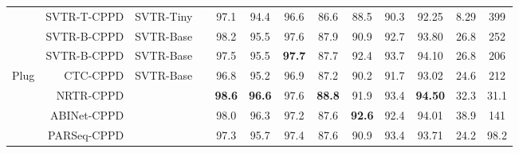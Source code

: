 \documentclass[10pt,journal,compsoc]{IEEEtran}
\begin{document}
\begin{table*}[t]
{\begin{tabular}{c|r|c|c|ccc|ccc|c|cc}
                        & SVTR-T-CPPD & SVTR-Tiny  &     & 97.1          & 94.4          & 96.6          & 86.6 & 88.5          & 90.3          & 92.25                                           & 8.29                                                                      & 399                                                               \\
& SVTR-B-CPPD  & SVTR-Base &     & 98.2 & 95.5 & 97.6 & 87.9 & 90.9 & 92.7 & 93.80                                                                       & 26.8                                                                      & 252                                                               \\
\cline{4-4}                        & SVTR-B-CPPD  & SVTR-Base &     & 97.5 & 95.5 & \textbf{97.7} & 87.7 & 92.4 & 93.7 & 94.10                                                                      & 26.8                                                                      & 206                                                               \\
\hline
\multirow{4}{*}{Plug}    & CTC-CPPD & \multirow{4}{*}{SVTR-Base} & \multirow{4}{*}{}     & 96.8 & 95.2 & 96.9 & 87.2 & 90.2 & 91.7 & 93.02 & 24.6 &212\\
&NRTR-CPPD &     &                        & \textbf{98.6} & \textbf{96.6} & 97.6 & \textbf{88.8} & 91.9 & 93.4 & \textbf{94.50} & 32.3 & 31.1\\
&ABINet-CPPD &       &                      & 98.0 & 96.3 & 97.2 & 87.6 & \textbf{92.6} & 92.4 & 94.01 & 38.9 & 141\\
&PARSeq-CPPD &               &              & 97.3 & 95.7 & 97.4 & 87.6 & 90.9 & 93.4 & 93.71 & 24.2 &98.2\\
                        \hline
\end{tabular}
}

\label{tab:sota}
\end{table*}
\end{document}
